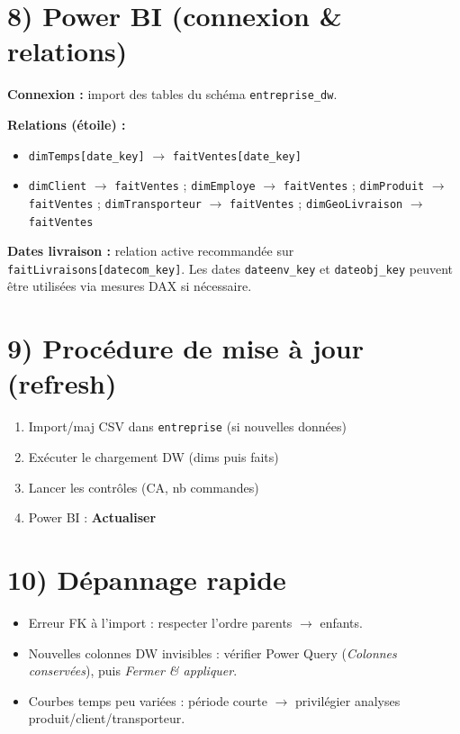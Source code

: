 \documentclass[a4paper,12pt]{article}
\begin{document}
\section*{8) Power BI (connexion \& relations)}
\textbf{Connexion :} import des tables du schéma \texttt{entreprise\_dw}.

\textbf{Relations (étoile) :}
\begin{itemize}
  \item \texttt{dimTemps[date\_key]} $\rightarrow$ \texttt{faitVentes[date\_key]}
  \item \texttt{dimClient} $\rightarrow$ \texttt{faitVentes} ; \texttt{dimEmploye} $\rightarrow$ \texttt{faitVentes} ;
  \texttt{dimProduit} $\rightarrow$ \texttt{faitVentes} ; \texttt{dimTransporteur} $\rightarrow$ \texttt{faitVentes} ;
  \texttt{dimGeoLivraison} $\rightarrow$ \texttt{faitVentes}
\end{itemize}

\textbf{Dates livraison :} relation active recommandée sur \texttt{faitLivraisons[datecom\_key]}. Les dates \texttt{dateenv\_key} et \texttt{dateobj\_key} peuvent être utilisées via mesures DAX si nécessaire.

\section*{9) Procédure de mise à jour (refresh)}
\begin{enumerate}
  \item Import/maj CSV dans \texttt{entreprise} (si nouvelles données)
  \item Exécuter le chargement DW (dims puis faits)
  \item Lancer les contrôles (CA, nb commandes)
  \item Power BI : \textbf{Actualiser}
\end{enumerate}

\section*{10) Dépannage rapide}
\begin{itemize}
  \item Erreur FK à l’import : respecter l’ordre parents $\rightarrow$ enfants.
  \item Nouvelles colonnes DW invisibles : vérifier Power Query (\textit{Colonnes conservées}), puis \textit{Fermer \& appliquer}.
  \item Courbes temps peu variées : période courte $\rightarrow$ privilégier analyses produit/client/transporteur.
\end{itemize}
\end{document}
